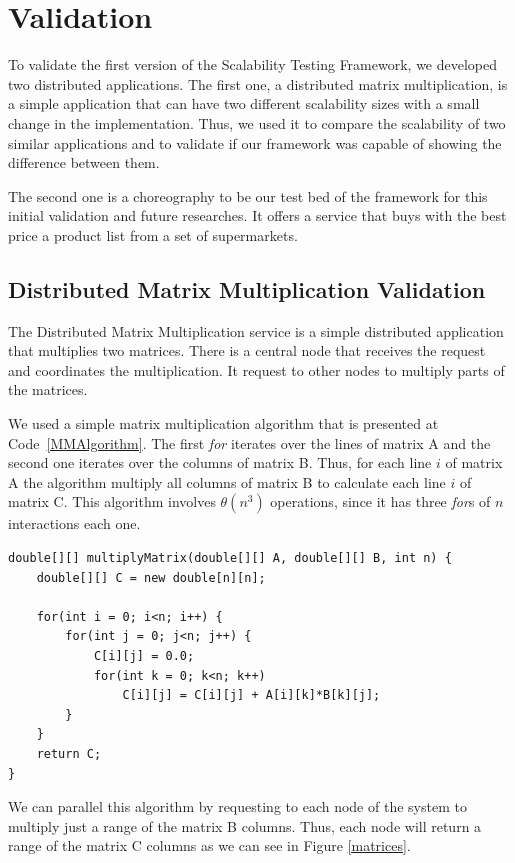 \section{Validation}
To validate the first version of the Scalability Testing Framework, we developed two distributed applications. The first one, a distributed matrix multiplication, is a simple application that can have two different scalability sizes with a small change in the implementation. Thus, we used it to compare the scalability of two similar applications and to validate if our framework was capable of showing the difference between them.

The second one is a choreography to be our test bed of the framework for this initial validation and future researches. It offers a service that buys with the best price a product list from a set of supermarkets.

\subsection{Distributed Matrix Multiplication Validation}

The Distributed Matrix Multiplication service is a simple distributed application that multiplies two matrices. There is a central node that receives the request and coordinates the multiplication. It request to other nodes to multiply parts of the matrices.

We used a simple matrix multiplication algorithm that is presented at Code~\ref{MMAlgorithm}. The first \emph{for} iterates over the lines of matrix A and the second one iterates over the columns of matrix B. Thus, for each line $i$ of matrix A the algorithm multiply all columns of matrix B to calculate each line $i$ of matrix C. This algorithm involves $\theta(n^3)$ operations, since it has three \emph{for}s of $n$ interactions each one.
\begin{lstlisting}
double[][] multiplyMatrix(double[][] A, double[][] B, int n) {
	double[][] C = new double[n][n];
	
	for(int i = 0; i<n; i++) {
		for(int j = 0; j<n; j++) {
			C[i][j] = 0.0;
			for(int k = 0; k<n; k++)
				C[i][j] = C[i][j] + A[i][k]*B[k][j];
		}
	}
	return C;
}
\end{lstlisting}

We can parallel this algorithm by requesting to each node of the system to multiply just a range of the matrix B columns. Thus, each node will return a range of the matrix C columns as we can see in Figure \ref{matrices}.

